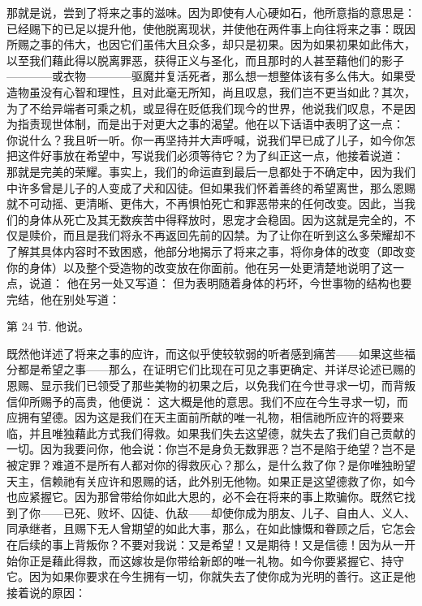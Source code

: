 那就是说，尝到了将来之事的滋味。因为即使有人心硬如石，他所意指的意思是：已经赐下的已足以提升他，使他脱离现状，并使他在两件事上向往将来之事：既因所赐之事的伟大，也因它们虽伟大且众多，却只是初果。因为如果初果如此伟大，以至我们藉此得以脱离罪恶，获得正义与圣化，而且那时的人甚至藉他们的影子————或衣物————驱魔并复活死者，那么想一想整体该有多么伟大。如果受造物虽没有心智和理性，且对此毫无所知，尚且叹息，我们岂不更当如此？其次，为了不给异端者可乘之机，或显得在贬低我们现今的世界，他说我们叹息，不是因为指责现世体制，而是出于对更大之事的渴望。他在以下话语中表明了这一点：  你说什么？我且听一听。你一再坚持并大声呼喊，说我们早已成了儿子，如今你怎把这件好事放在希望中，写说我们必须等待它？为了纠正这一点，他接着说道：  那就是完美的荣耀。事实上，我们的命运直到最后一息都处于不确定中，因为我们中许多曾是儿子的人变成了犬和囚徒。但如果我们怀着善终的希望离世，那么恩赐就不可动摇、更清晰、更伟大，不再惧怕死亡和罪恶带来的任何改变。因此，当我们的身体从死亡及其无数疾苦中得释放时，恩宠才会稳固。因为这就是完全的，不仅是赎价，而且是我们将永不再返回先前的囚禁。为了让你在听到这么多荣耀却不了解其具体内容时不致困惑，他部分地揭示了将来之事，将你身体的改变（即改变你的身体）以及整个受造物的改变放在你面前。他在另一处更清楚地说明了这一点，说道：  他在另一处又写道：  但为表明随着身体的朽坏，今世事物的结构也要完结，他在别处写道： \par

第 24 节.  他说。\par

既然他详述了将来之事的应许，而这似乎使较软弱的听者感到痛苦——如果这些福分都是希望之事——那么，在证明它们比现在可见之事更确定、并详尽论述已赐的恩赐、显示我们已领受了那些美物的初果之后，以免我们在今世寻求一切，而背叛信仰所赐予的高贵，他便说：  这大概是他的意思。我们不应在今生寻求一切，而应拥有望德。因为这是我们在天主面前所献的唯一礼物，相信祂所应许的将要来临，并且唯独藉此方式我们得救。如果我们失去这望德，就失去了我们自己贡献的一切。因为我要问你，他会说：你岂不是身负无数罪恶？岂不是陷于绝望？岂不是被定罪？难道不是所有人都对你的得救灰心？那么，是什么救了你？是你唯独盼望天主，信赖祂有关应许和恩赐的话，此外别无他物。如果正是这望德救了你，如今也应紧握它。因为那曾带给你如此大恩的，必不会在将来的事上欺骗你。既然它找到了你——已死、败坏、囚徒、仇敌——却使你成为朋友、儿子、自由人、义人、同承继者，且赐下无人曾期望的如此大事，那么，在如此慷慨和眷顾之后，它怎会在后续的事上背叛你？不要对我说：又是希望！又是期待！又是信德！因为从一开始你正是藉此得救，而这嫁妆是你带给新郎的唯一礼物。如今你要紧握它、持守它。因为如果你要求在今生拥有一切，你就失去了使你成为光明的善行。这正是他接着说的原因： \par

